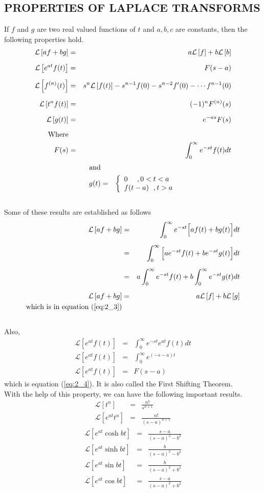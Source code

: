 \documentclass[11pt]{report}
\newcommand{\Laplace}{\mathcal{L}}
\newcommand{\ft}{f(t)}
\newcommand{\ftp}[1]{f^{#1}(t)}
\newcommand{\Fs}{F(s)}
\newcommand{\sbracket}[1]{\left[#1\right]}
\newcommand{\LFt}{\Laplace \sbracket{\ft}}
\newcommand{\LFn}[1]{\Laplace \sbracket{#1}}
\newcommand{\sps}{\\[0.2cm]}
\newcommand{\refn}[1]{(\ref{#1})}
\newcommand{\refx}[1]{\refn{eq:#1}}
\newcommand{\sprime}{'}
\begin{document}
	\subsection{PROPERTIES OF LAPLACE TRANSFORMS}
	If $f$ and $g$ are two real valued functions of $t$ and $a,b,c$ are constants, then the following properties hold.
	\begin{eqnarray}
		\LFn{af + bg} &=& a\LFn{f} + b\LFn{b}\label{eq:2_3}\sps
		\LFn{e^{at}\ft} &=& F(s-a)\label{eq:2_4}\sps
		\LFn{\ftp{(n)}} &=& s^n\LFt - s^{n-1}f(0) - s^{n-2}f\sprime(0) - \cdots f^{n-1}(0)\label{eq:2_5}\sps
		\LFn{t^n\ft} &=& (-1)^{n}F^{(n)}(s)\sps
		\LFn{g(t)} &=& e^{-as}\Fs\sps
		\text{Where}\notag\\
		\Fs &=& \int_0^\infty e^{-st}\ft dt\notag
	\end{eqnarray}
	\begin{eqnarray}
		\text{and}\notag\\
		g(t) &=& \left\{\begin{array}{l}
			0~~~~, 0 < t < a\\
			f(t-a)~~, t > a
		\end{array}\right.\notag
	\end{eqnarray}\\
	Some of these results are established as follows
	\begin{eqnarray*}
		\LFn{af + bg} &=& \int_0^\infty e^{-st}\Big[a\ft + bg(t)\Big]dt\sps
		&=& \int_0^\infty\Big[ae^{-st}\ft + be^{-st}g(t)\Big]dt\sps
		&=& a\int_0^\infty e^{-st}f(t) + b\int_0^\infty e^{-st}g(t)dt\sps
		\LFn{af + bg} &=& a \LFn{f} + b\LFn{g}\\
		\text{which is in equation \refx{2_3}}
	\end{eqnarray*}
	\\Also,
	\begin{eqnarray*}
		\LFn{e^{at}\ft} &=&\int_0^\infty e^{-st}e^{at}\ft dt\sps
		\LFn{e^{at}\ft} &=& \int_0^\infty e^{(-s-a)t}\\
		\LFn{e^{at}\ft} &=& F(s-a)
	\end{eqnarray*}
	which is equation \refx{2_4}. It is also called the First Shifting Theorem.\sps
	With the help of this property, we can have the following important results.
	\begin{eqnarray}
		\LFn{t^n} &=& \frac{n!}{s^{n+1}}\sps
		\LFn{e^{at}t^n} &=& \frac{n!}{(s-a)^{n+1}}
	\end{eqnarray}
	\begin{eqnarray}
		\LFn{e^{at}\cosh bt} &=&\frac{s-a}{(s-a)^2-b^2}\sps
		\LFn{e^{at}\sinh bt} &=& \frac{b}{(s-a)^2-b^2}\sps
		\LFn{e^{at}\sin bt} &=& \frac{b}{(s-a)^2+b^2}\sps
		\LFn{e^{at}\cos bt} &=& \frac{s-a}{(s-a)^2 + b^2}
	\end{eqnarray}
\end{document}
